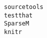 \documentclass[
  letterpaper,
  DIV=11,
  numbers=noendperiod]{scrreprt}
\begin{document}
\begin{verbatim}
sourcetools                                                                                                                                                                                                                                                                                                                                                                                                                                                                                                                                                                                                                                                                                                                                                                                                                                                                                                                                                                                                                                                                                                                                                                                                                                                                                          testthat
SparseM                                                                                                                                                                                                                                                                                                                                                                                                                                                                                                                                                                                                                                                                                                                                                                                                                                                                                                                                                                                                                                                                                                                                                                                                                                                                                                 knitr

\end{verbatim}
\end{document}
